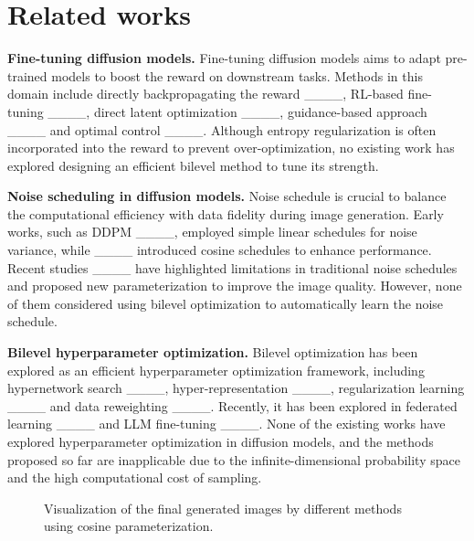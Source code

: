 \section{Related works}
\noindent\textbf{Fine-tuning diffusion models. } Fine-tuning diffusion models aims to adapt pre-trained models to boost the reward on downstream tasks. Methods in this domain include directly backpropagating the reward ____, RL-based fine-tuning ____, direct latent optimization ____, guidance-based approach ____ and optimal control ____. Although entropy regularization is often incorporated into the reward to prevent over-optimization, no existing work has explored designing an efficient bilevel method to tune its strength. 

\noindent\textbf{Noise scheduling in diffusion models. } Noise schedule is crucial to balance the computational efficiency with data fidelity during image generation. Early works, such as DDPM ____, employed simple linear schedules for noise variance, while ____ introduced cosine schedules to enhance performance. Recent studies ____ have highlighted limitations in traditional noise schedules and proposed new parameterization to improve the image quality. However, none of them considered using bilevel optimization to automatically learn the noise schedule. 

\noindent\textbf{Bilevel hyperparameter optimization. } Bilevel optimization has been explored as an efficient hyperparameter optimization framework, including hypernetwork search ____, hyper-representation ____, regularization learning ____ and data reweighting ____. Recently, it has been explored in federated learning ____ and LLM fine-tuning ____. None of the existing works have explored hyperparameter optimization in diffusion models, and the methods proposed so far are inapplicable due to the infinite-dimensional probability space and the high computational cost of sampling. 


\begin{figure}[tbp]
    \centering
    \setlength{\tabcolsep}{1pt} %
    \vspace{-0.5cm}
    \caption{Visualization of the final generated images by different methods using cosine parameterization.}
    \label{fig:results_visualization}
    \vspace{-.7cm}
\end{figure} 


\vspace{-0.2cm}